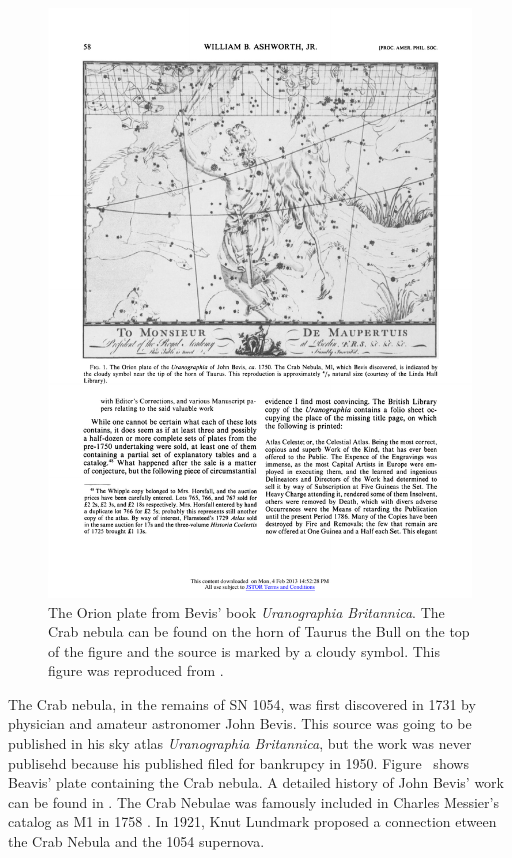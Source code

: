 \begin{figure}[htbp]
  \centering
  \includegraphics[width=\textwidth]{chapters/introduction/figures/bevis_crab.pdf}
  \caption{The Orion plate from Bevis' book {\em Uranographia Britannica}.
  The Crab nebula can be found on the horn of Taurus the Bull 
  on the top of the figure and the source is marked by a 
  cloudy symbol.
  This figure was reproduced from \cite{ashworth_1981_bevis-uranographia}.}
\end{figure}

The Crab nebula, in the remains of SN 1054,
was first discovered in 1731 by physician and amateur astronomer
John Bevis.  This source was going to be published in his sky atlas
{\em Uranographia Britannica}, but the work was never publisehd because
his published filed for bankrupcy in 1950.  Figure~
shows Beavis' plate containing the Crab nebula.  A detailed history of
John Bevis' work can be found in \cite{ashworth_1981_bevis-uranographia}.
The Crab Nebulae was famously included in Charles Messier's catalog as
M1 in 1758 \cite{hester_2008_nebula:-astrophysical}.
In 1921,
Knut Lundmark proposed a connection etween the Crab Nebula and the 1054 supernova.

